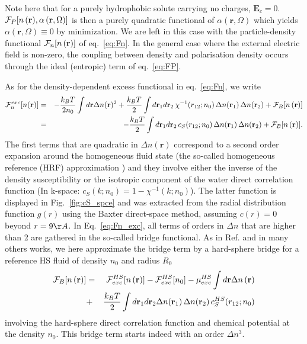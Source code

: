 \documentclass[aip,jcp,preprint]{revtex4-1}
\newcommand{\bea}{\begin{eqnarray}}
\newcommand{\eea}{\end{eqnarray}}
\newcommand{\nn}{\nonumber}
\newcommand{\rr}{\mathbf{r}}
\newcommand{\rhon}{{n\left({\mathbf r}\right)}}
\newcommand{\alpharom}{{\alpha\left({\mathbf r},\Omega\right)}}
\newcommand{\F}{{\cal F}}
\newcommand{\EE}{\mathbf{E}}
\begin{document}
Note here that for a purely hydrophobic solute carrying no charges, $\EE_c = 0$. 
$\F_P[\rhon,\alpharom]$ is then a purely quadratic functional of $\alpharom$ which yields $\alpharom \equiv 0$ by minimization. 
We are left in this case  with the particle-density functional $\F_n[\rhon]$ of eq.~\ref{eq:Fn}.  In the general case where the external electric field is non-zero, the coupling between density and polarisation density occurs through the ideal (entropic) term of eq.~\ref{eq:FP}.

As for the density-dependent excess functional in eq.~\ref{eq:Fn},  we write
\bea
\F_n^{exc}[n(\rr)] &=&  -\frac{k_BT}{2n_0}  \int d\rr \Delta n(\rr)^2 + \frac{k_BT}{2}  \int d\rr_1 d\rr_2 \, \chi^{-1}(r_{12};n_0) \, \Delta n(\rr_1) \,  \Delta n(\rr_2)  + \F_B[\rhon] \nn \\
&=& - \frac{k_BT}{2} \int d\rr_1 d\rr_2 \, c_S(r_{12};n_0) \, \Delta n(\rr_1) \,  \Delta n(\rr_2)  + \F_B[\rhon].
\label{eq:Fn_exc} 
\eea
The first terms that are quadratic in $\Delta n(\rr)$ correspond  to a second order expansion around the homogeneous fluid state (the so-called homogeneous reference (HRF) approximation \cite{ramirez02}) and they involve either the  inverse of the density susceptibility or the isotropic component of the water direct correlation function (In k-space: $c_S(k;n_0) = 1 - \chi^{-1}(k;n_0)$). The latter function is displayed in Fig.~\ref{fig:cS_spce} and was extracted from the radial distribution function $g(r)$  using the Baxter direct-space method, assuming $c(r)=0$ beyond $r = 9 \AA$\cite{ramirez05-CP}. 
In Eq.~\ref{eq:Fn_exc}, all   terms of  orders in $\Delta n$ that are higher than 2 are gathered in the  so-called bridge functional. As in Ref.\cite{levesque12_1} and  in many others works\cite{rosenfeld93,zhao-wu11,zhao-wu11-correction,liu13}, we here approximate the bridge term by a hard-sphere bridge for a reference HS fluid of density $n_0$ and radius $R_0$
\bea
\F_B[\rhon] &= &\F_{exc}^{HS}[\rhon] -   \F_{exc}^{HS}[n_0] - \mu_{exc}^{HS} \int d\rr \Delta\rhon \nn \\
& +  & \frac{k_BT}{2} \int d\rr_1d\rr_2 \Delta n(\rr_1) \, \Delta n(\rr_2) \, c_S^{HS}(r_{12};n_0)  
\label{eq:Fn_bridge}
\eea
involving the hard-sphere direct correlation function  and chemical potential  at the density $n_0$. 
This bridge term starts indeed with an  order $\Delta n^3$.
\end{document}
